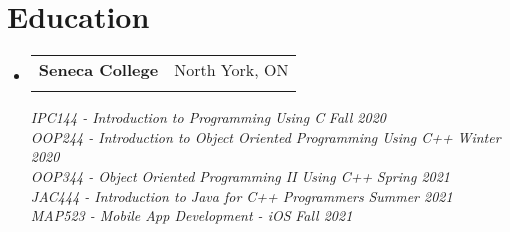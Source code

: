 \documentclass[letterpaper,11pt]{article}
\makeatletter
\newcommand{\resumeSubheading}[4]{
  \vspace{-2pt}\item
    \begin{tabular*}{0.97\textwidth}[t]{l@{\extracolsep{\fill}}r}
      \textbf{#1} & #2 \\
      \textit{\small#3} & \textit{\small #4} \\
    \end{tabular*}\vspace{-7pt}
}
\newcommand{\resumeSubHeadingListStart}{\begin{itemize}[leftmargin=0.15in, label={}]}
\newcommand{\resumeSubHeadingListEnd}{\end{itemize}}
\newcommand{\resumeCourseEntry}[2]{\textit{#1} \hfill \textit{#2} \\}
\makeatother
\begin{document}
\section{Education}
  \resumeSubHeadingListStart
    \resumeSubheading
      {Seneca College}{North York, ON}{}{}
      \resumeCourseEntry{IPC144 - Introduction to Programming Using C}{Fall 2020}
      \resumeCourseEntry{OOP244 - Introduction to Object Oriented Programming Using C++}{Winter 2020}
      \resumeCourseEntry{OOP344 - Object Oriented Programming II Using C++}{Spring 2021}
      \resumeCourseEntry{JAC444 - Introduction to Java for C++ Programmers}{Summer 2021}
      \resumeCourseEntry{MAP523 - Mobile App Development - iOS}{Fall 2021}
  \resumeSubHeadingListEnd


\end{document}
